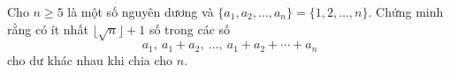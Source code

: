 \ifshowproblem
\begin{problem}\label{example:ROU-2015-SOM-J-P4}
    Cho \( n \ge 5 \) là một số nguyên dương và \( \{a_1,a_2,\ldots,a_n\} = \{1,2,\ldots,n\} \). 
    Chứng minh rằng có ít nhất \( \lfloor \sqrt{n} \rfloor + 1 \) số trong các số 
    \[
        a_1,\ a_1 + a_2,\ \ldots,\ a_1 + a_2 + \cdots + a_n
    \]
    cho dư khác nhau khi chia cho \( n \).
\end{problem}
\fi

\footnotemark
{}
\fi